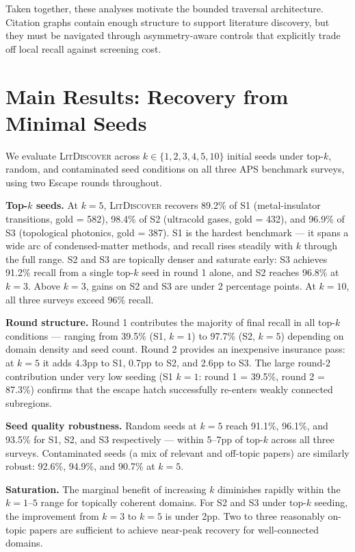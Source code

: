 \documentclass[manuscript,review,anonymous]{acmart}
\newcommand{\ldiscover}{\textsc{LitDiscover}}
\begin{document}
Taken together, these analyses motivate the bounded traversal architecture. Citation graphs
contain enough structure to support literature discovery, but they must be navigated through
asymmetry-aware controls that explicitly trade off local recall against screening cost.

\section{Main Results: Recovery from Minimal Seeds}

We evaluate \ldiscover{} across $k \in \{1,2,3,4,5,10\}$ initial seeds under top-$k$,
random, and contaminated seed conditions on all three APS benchmark surveys, using two
Escape rounds throughout.

\textbf{Top-$k$ seeds.} At $k = 5$, \ldiscover{} recovers 89.2\% of S1 (metal-insulator
transitions, gold = 582), 98.4\% of S2 (ultracold gases, gold = 432), and 96.9\% of S3
(topological photonics, gold = 387). S1 is the hardest benchmark --- it spans a wide arc of
condensed-matter methods, and recall rises steadily with $k$ through the full range. S2 and
S3 are topically denser and saturate early: S3 achieves 91.2\% recall from a single top-$k$
seed in round 1 alone, and S2 reaches 96.8\% at $k = 3$. Above $k = 3$, gains on S2 and S3
are under 2 percentage points. At $k = 10$, all three surveys exceed 96\% recall.

\textbf{Round structure.} Round 1 contributes the majority of final recall in all top-$k$
conditions --- ranging from 39.5\% (S1, $k = 1$) to 97.7\% (S2, $k = 5$) depending on
domain density and seed count. Round 2 provides an inexpensive insurance pass: at $k = 5$
it adds 4.3pp to S1, 0.7pp to S2, and 2.6pp to S3. The large round-2 contribution under
very low seeding (S1 $k = 1$: round 1 = 39.5\%, round 2 = 87.3\%) confirms that the escape
hatch successfully re-enters weakly connected subregions.

\textbf{Seed quality robustness.} Random seeds at $k = 5$ reach 91.1\%, 96.1\%, and 93.5\%
for S1, S2, and S3 respectively --- within 5--7pp of top-$k$ across all three surveys.
Contaminated seeds (a mix of relevant and off-topic papers) are similarly robust: 92.6\%,
94.9\%, and 90.7\% at $k = 5$.

\textbf{Saturation.} The marginal benefit of increasing $k$ diminishes rapidly within the
$k = 1$--$5$ range for topically coherent domains. For S2 and S3 under top-$k$ seeding,
the improvement from $k = 3$ to $k = 5$ is under 2pp. Two to three reasonably on-topic
papers are sufficient to achieve near-peak recovery for well-connected domains.
\end{document}
